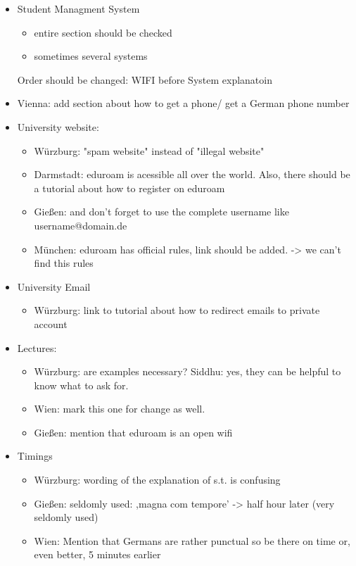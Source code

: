 \begin{itemize}
        \item Student Managment System
          \begin{itemize}
            \item entire section should be checked
            \item sometimes several systems
          \end{itemize}

        Order should be changed: WIFI before System explanatoin
        \item Vienna: add section about how to get a phone/ get a German phone number

        \item University website:
          \begin{itemize}
            \item Würzburg: "spam website" instead of "illegal website"
            \item Darmstadt: eduroam is acessible all over the world. Also, there should be a tutorial about how to register on eduroam
            \item Gießen: and don't forget to use the complete username like username@domain.de
            \item München: eduroam has official rules, link should be added. -> we can't find this rules
          \end{itemize}

        \item University Email
          \begin{itemize}
            \item Würzburg: link to tutorial about how to redirect emails to private account
          \end{itemize}

        \item Lectures:
          \begin{itemize}
            \item Würzburg: are examples necessary? Siddhu: yes, they can be helpful to know what to ask for.
            \item Wien: mark this one for change as well.
            \item Gießen: mention that eduroam is an open wifi
          \end{itemize}

        \item Timings
          \begin{itemize}
            \item Würzburg: wording of the explanation of s.t. is confusing
            \item Gießen: seldomly used: ,magna com tempore' -> half hour later (very seldomly used)
            \item Wien: Mention that Germans are rather punctual so be there on time or, even better, 5 minutes earlier
          \end{itemize}


\end{itemize}
